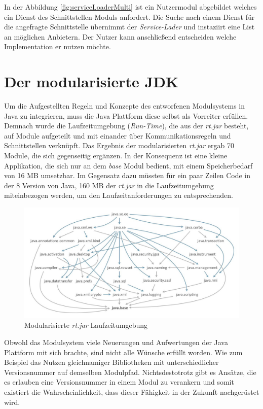     In der Abbildung \ref{fig:serviceLoaderMulti} ist ein Nutzermodul abgebildet welches ein Dienst des Schnittstellen-Moduls anfordert. Die Suche nach einem Dienst für die angefragte Schnittstelle übernimmt der \textit{Service-Lader} und instaziirt eine List an möglichen Anbietern. Der Nutzer kann anschließend entscheiden welche Implementation er nutzen möchte.   


\section{Der modularisierte JDK} \label{sec:modular_java_base}
  Um die Aufgestellten Regeln und Konzepte des entworfenen Modulsystems in Java zu integrieren, muss die Java Plattform diese selbst als Vorreiter erfüllen. \bigbreak
  Demnach wurde die Laufzeitumgebung (\textit{Run-Time}), die aus der \textit{rt.jar} besteht, auf Module aufgeteilt und mit einander über Kommunikationsregeln und Schnittstellen verknüpft. Das Ergebnis der modularisierten \textit{rt.jar} ergab 70 Module, die sich gegenseitig ergänzen. \newline
  In der Konsequenz ist eine kleine Applikation, die sich nur an dem \textit{base} Modul bedient, mit einem Speicherbedarf von 16 MB umsetzbar. Im Gegensatz dazu müssten für ein paar Zeilen Code in der 8 Version von Java, 160 MB der \textit{rt.jar} in die Laufzeitumgebung miteinbezogen werden, um den Laufzeitanforderungen zu entsprechenden.\bigbreak
  \begin{figure}[h!]
   \centering
   \includegraphics[width=\textwidth]{material/images/moduleGraph.jpg}
   \caption{Modularisierte \textit{rt.jar} Laufzeitumgebung \cite{modGraph}}
   \label{fig:jdk}
  \end{figure}
  Obwohl das Modulsystem viele Neuerungen und Aufwertungen der Java Plattform mit sich brachte, sind nicht alle Wünsche erfüllt worden. Wie zum Beispiel das Nutzen gleichnamiger Bibliotheken mit unterschiedlicher Versionsnummer auf demselben Modulpfad.\newline
  Nichtsdestotrotz gibt es Ansätze, die es erlauben eine Versionsnummer in einem Modul zu verankern und somit existiert die Wahrscheinlichkeit, dass dieser Fähigkeit in der Zukunft nachgerüstet wird. 
 

